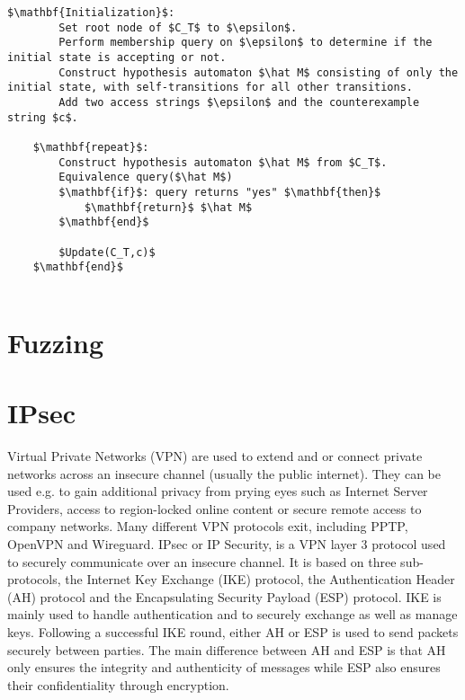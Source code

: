 \begin{lstlisting}[mathescape=true, float=ht, caption=$KV$ algorithm, label=lst:kv]
	$\mathbf{Initialization}$: 
		Set root node of $C_T$ to $\epsilon$. 
		Perform membership query on $\epsilon$ to determine if the initial state is accepting or not.
		Construct hypothesis automaton $\hat M$ consisting of only the initial state, with self-transitions for all other transitions.
		Add two access strings $\epsilon$ and the counterexample string $c$.
	
	$\mathbf{repeat}$:
		Construct hypothesis automaton $\hat M$ from $C_T$.
		Equivalence query($\hat M$)
		$\mathbf{if}$: query returns "yes" $\mathbf{then}$
			$\mathbf{return}$ $\hat M$
		$\mathbf{end}$
		
		$Update(C_T,c)$
	$\mathbf{end}$
	
\end{lstlisting}


\section{Fuzzing}

\section{IPsec}

Virtual Private Networks (VPN) are used to extend and or connect private networks across an insecure channel (usually the public internet). They can be used e.g. to gain additional privacy from prying eyes such as Internet Server Providers, access to region-locked online content or secure remote access to company networks. Many different VPN protocols exit, including PPTP, OpenVPN and Wireguard. IPsec or IP Security, is a VPN layer 3 protocol used to securely communicate over an insecure channel. It is based on three sub-protocols, the Internet Key Exchange (IKE) protocol, the Authentication Header (AH) protocol and the Encapsulating Security Payload (ESP) protocol. IKE is mainly used to handle authentication and to securely exchange as well as manage keys. Following a successful IKE round, either AH or ESP is used to send packets securely between parties. The main difference between AH and ESP is that AH only ensures the integrity and authenticity of messages while ESP also ensures their confidentiality through encryption.

